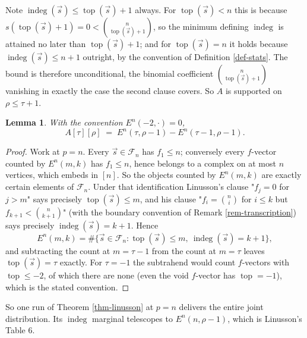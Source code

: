 \documentclass[11pt, a4paper, abstract=yes]{scrartcl}
\theoremstyle{definition}
\theoremstyle{remark}
\theoremstyle{plain}
\newtheorem{lemma}[definition]{Lemma}
\newcommand{\indeg}{\operatorname{indeg}}
\newcommand{\tp}{\operatorname{top}}
\begin{document}
Note \(\indeg(\vec s)\le\tp(\vec s)+1\) always. For \(\tp(\vec s)<n\) this is because
\(s(\tp(\vec s)+1)=0<\binom n{\tp(\vec s)+1}\), so the minimum defining \(\indeg\) is attained no later
than \(\tp(\vec s)+1\); and for \(\tp(\vec s)=n\) it holds because \(\indeg(\vec s)\le n+1\) outright, by
the convention of Definition \ref{def-stats}. The bound is therefore unconditional, the binomial
coefficient \(\binom n{\tp(\vec s)+1}\) vanishing in exactly the case the second clause covers. So
\(A\) is supported on \(\rho\le\tau+1\).

\begin{lemma}
With the convention \(E^n(-2,\cdot)=0\),
\begin{equation}\label{eq:auto-12}
  A[\tau][\rho]\;=\;E^n(\tau,\rho-1)-E^n(\tau-1,\rho-1).
\end{equation}
\label{lem-joint}
\end{lemma}

\begin{proof}
Work at \(p=n\). Every \(\vec s\in\mathcal F_n\) has \(f_1\le n\); conversely every \(f\)-vector counted by
\(E^n(m,k)\) has \(f_1\le n\), hence belongs to a complex on at most \(n\) vertices, which embeds in
\([n]\). So the objects counted by \(E^n(m,k)\) are exactly certain elements of \(\mathcal F_n\).
Under that identification Linusson's clause "\(f_j=0\) for \(j>m\)" says precisely \(\tp(\vec s)\le m\),
and his clause "\(f_i=\binom ni\) for \(i\le k\) but \(f_{k+1}<\binom n{k+1}\)" (with the boundary
convention of Remark \ref{rem-transcription}) says precisely \(\indeg(\vec s)=k+1\). Hence
\[
  E^n(m,k)=\#\lbrace \vec s\in\mathcal F_n:\tp(\vec s)\le m,\ \indeg(\vec s)=k+1\rbrace ,
\]
and subtracting the count at \(m=\tau-1\) from the count at \(m=\tau\) leaves \(\tp(\vec s)=\tau\)
exactly. For \(\tau=-1\) the subtrahend would count \(f\)-vectors with \(\tp\le-2\), of which there
are none (even the void \(f\)-vector has \(\tp=-1\)), which is the stated convention.
\end{proof}

So one run of Theorem \ref{thm-linusson} at \(p=n\) delivers the entire joint distribution. Its
\(\indeg\) marginal telescopes to \(E^n(n,\rho-1)\), which is Linusson's Table 6.
\end{document}
